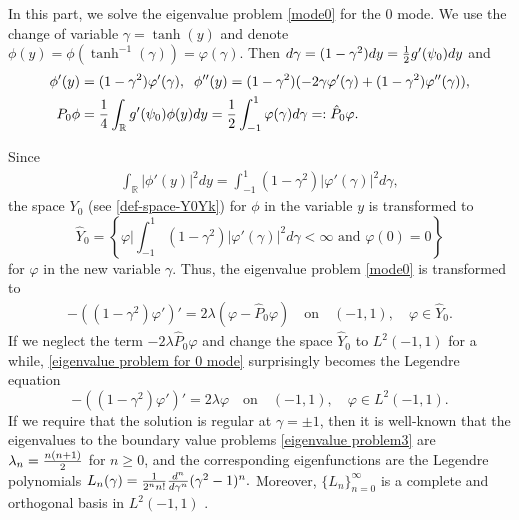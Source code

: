 \documentclass[1 [leqno, 11pt]{amsart}
\numberwithin{equation}{section}
\begin{document}
\begin{CJK*}{GBK}{song}
\medskip

In this part, we solve the eigenvalue problem \eqref{mode0} for the $0$ mode. We use the change of variable $\gamma=\tanh(y)$ and
denote $\phi(y)=\phi(\tanh^{-1}(\gamma))=\varphi(\gamma)$.
 Then $d\gamma=(1-\gamma^2)dy={1\over2}g'(\psi_0)dy$ and
\begin{align*}
\phi'(y)&=(1-\gamma^2)\varphi'(\gamma),\;\;\phi''(y)=(1-\gamma^2)(-2\gamma\varphi'(\gamma)+(1-\gamma^2)\varphi''(\gamma)),\\
P_0\phi&={1\over4}\int_{\mathbb{R}}g'(\psi_0)\phi(y)dy={1\over2}\int_{-1}^{1}\varphi(\gamma)d\gamma=:\hat P_0\varphi.
\end{align*}

Since
\begin{align}\label{phi-der-varohi-der}
\int_{\mathbb{R}}|\phi'(y)|^2dy=\int_{-1}^1(1-\gamma^2)|\varphi'(\gamma)|^2d\gamma,
\end{align}
 the space $Y_0$ (see \eqref{def-space-Y0Yk}) for $\phi$ in the variable $y$ is transformed to
\begin{equation*}
\hat Y_0=\left\{\varphi\bigg|\int_{-1}^1(1-\gamma^2)|\varphi'(\gamma)|^2d\gamma<\infty\text{ and }\varphi(0)=0 \right\}
\end{equation*}
for $\varphi$ in the new variable $\gamma$.
Thus, the eigenvalue problem \eqref{mode0} is transformed to
\begin{align}\label{eigenvalue problem for 0 mode}
-\left((1-\gamma^2)  \varphi'\right)' = 2 \lambda(\varphi-\hat{P}_0\varphi) \quad \text{on}\quad (-1,1),\quad\varphi\in \hat Y_0.
\end{align}
If we neglect the term $-2\lambda\hat P_0\varphi$ and change the space $\hat Y_0$ to $L^2(-1,1)$ for a while, \eqref{eigenvalue problem for 0 mode} surprisingly becomes the  Legendre equation
\begin{equation}\label{eigenvalue problem3}
-\left((1-\gamma^2)  \varphi'\right)' = 2 \lambda\varphi \quad \text{on}\quad (-1,1),\quad \varphi\in L^2(-1,1).
\end{equation}
If we require that  the solution is regular at $\gamma=\pm1$, then
it is well-known that the eigenvalues to the boundary value problems \eqref{eigenvalue problem3} are  $\lambda_n={n(n+1)\over2}$ for $n\geq0$, and the corresponding eigenfunctions are the Legendre polynomials
$
L_n(\gamma)={1\over2^nn!}{d^n\over d\gamma^n}(\gamma^2-1)^n.
$
Moreover, $\{L_n\}_{n=0}^\infty$ is a complete and  orthogonal basis in $L^2(-1,1)$ \cite{Weidmann80}.


\end{CJK*}
\end{document}
